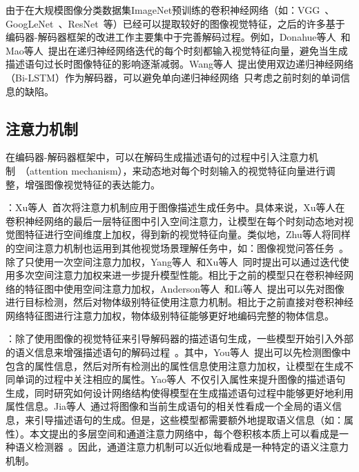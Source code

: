 由于在大规模图像分类数据集ImageNet预训练的卷积神经网络（如：VGG~\cite{simonyan2015very}、GoogLeNet~\cite{szegedy2015going}、ResNet~\cite{he2016deep}等）已经可以提取较好的图像视觉特征，之后的许多基于编码器-解码器框架的改进工作主要集中于完善解码过程。例如，Donahue等人~\cite{donahue2015long}和Mao等人~\cite{mao2015deep}提出在递归神经网络迭代的每个时刻都输入视觉特征向量，避免当生成描述语句过长时图像特征的影响逐渐减弱。Wang等人~\cite{wang2016image}提出使用双边递归神经网络（Bi-LSTM）作为解码器，可以避免单向递归神经网络~\cite{hochreiter1997long}只考虑之前时刻的单词信息的缺陷。

\subsection{注意力机制}

在编码器-解码器框架中，可以在解码生成描述语句的过程中引入注意力机制~\cite{bahdanau2014neural}（attention mechanism），来动态地对每个时刻输入的视觉特征向量进行调整，增强图像视觉特征的表达能力。

\textbf{}：Xu等人~\cite{xu2015show}首次将注意力机制应用于图像描述生成任务中。具体来说，Xu等人在卷积神经网络的最后一层特征图中引入空间注意力，让模型在每个时刻动态地对视觉图特征进行空间维度上加权，得到新的视觉特征向量。类似地，Zhu等人将同样的空间注意力机制也运用到其他视觉场景理解任务中，如：图像视觉问答任务~\cite{zhu2016visual7w}。除了只使用一次空间注意力加权，Yang等人~\cite{yang2016stacked}和Xu等人~\cite{xu2016ask}同时提出可以通过迭代使用多次空间注意力加权来进一步提升模型性能。相比于之前的模型只在卷积神经网络的特征图中使用空间注意力加权，Anderson等人~\cite{anderson2018bottom}和Li等人~\cite{li2016visual}提出可以先对图像进行目标检测，然后对物体级别特征使用注意力机制。相比于之前直接对卷积神经网络特征图进行注意力加权，物体级别特征能够更好地编码完整的物体信息。

\textbf{}：除了使用图像的视觉特征来引导解码器的描述语句生成，一些模型开始引入外部的语义信息来增强描述语句的解码过程~\cite{wu2016what,you2016image,pan2017video,yao2017boosting}。其中，You等人~\cite{you2016image}提出可以先检测图像中包含的属性信息，然后对所有检测出的属性信息使用注意力加权，让模型在生成不同单词的过程中关注相应的属性。Yao等人~\cite{yao2017boosting}不仅引入属性来提升图像的描述语句生成，同时研究如何设计网络结构使得模型在生成描述语句过程中能够更好地利用属性信息。Jia等人~\cite{jia2015guiding}通过将图像和当前生成语句的相关性看成一个全局的语义信息，来引导描述语句的生成。但是，这些模型都需要额外地提取语义信息（如：属性）。本文提出的多层空间和通道注意力网络中，每个卷积核本质上可以看成是一种语义检测器~\cite{zeiler2014visualizing}。因此，通道注意力机制可以近似地看成是一种特定的语义注意力机制。


